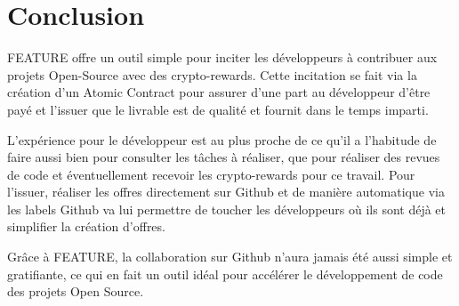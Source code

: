 \documentclass[
	a4paper, %
	10pt, %
	unnumberedsections, %
	twoside, %
]{LTJournalArticle}
\begin{document}
\section{Conclusion}

FEATURE offre un outil simple pour inciter les développeurs à contribuer aux projets Open-Source avec des crypto-rewards. Cette incitation se fait via la création d’un Atomic Contract pour assurer d’une part au développeur d’être payé et l’issuer que le livrable est de qualité et fournit dans le temps imparti.

L’expérience pour le développeur est au plus proche de ce qu’il a l’habitude de faire aussi bien pour consulter les tâches à réaliser, que pour réaliser des revues de code et éventuellement recevoir les crypto-rewards pour ce travail. Pour l'issuer, réaliser les offres directement sur Github et de manière automatique via les labels Github va lui permettre de toucher les développeurs où ils sont déjà et simplifier la création d’offres.

Grâce à FEATURE, la collaboration sur Github n’aura jamais été aussi simple et gratifiante, ce qui en fait un outil idéal pour accélérer le développement de code des projets Open Source.
\end{document}
